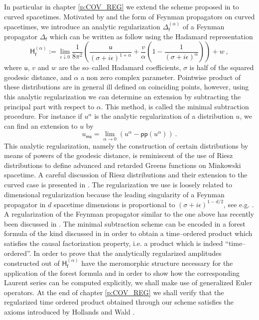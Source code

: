 \documentclass[11pt]{book}
\newcommand{\pp}{\mathsf{pp}}
\newcommand{\ms}{\mathsf{ms}}
\newcommand{\Hsf}{\mathsf{H}}
\newcommand{\fsf}{\mathsf{f}}
\newcommand{\usf}{\mathsf{u}}
\theoremstyle{break}
\begin{document}
In particular in chapter \ref{p:COV_REG} we extend the scheme proposed in \cite{DFKR_2014} to curved spacetimes. Motivated by \cite{BG_1972} and the form of Feynman propagators on curved spacetimes, we introduce an analytic regularization $\Delta^{(\alpha)}_\fsf$ of a Feynman propagator $\Delta_\fsf$ which can be written as follow using the Hadamard representation
%
\begin{equation*}
\Hsf^{(\alpha)}_\fsf := \lim_{\epsilon \downarrow 0} \frac{1}{8\pi^2} \left(\frac{\usf}{(\sigma+i\epsilon )^{1+\alpha}} + \frac{v}{\alpha} \left(1-\frac{1}{(\sigma+i\epsilon )^{\alpha}}\right)\right) + w \ ,
\end{equation*}
%
where $\usf$, $v$ and $w$ are the so--called Hadamard coefficients, $\sigma$ is half of the squared geodesic distance, and $\alpha$ a non zero complex parameter. Pointwise product of these distributions are in general ill defined on coinciding points, however, using this analytic regularization we can determine an extension by subtracting the principal part with respect to $\alpha$. This method, is called the minimal subtraction procedure. For instance if $u^\alpha$ is the analytic regularization of a distribution $u$, we can find an extension to $u$ by
%
\begin{equation*}
u_\ms = \lim_{\alpha \to 0} \left( u^\alpha - \pp(u^\alpha) \right) \ .
\end{equation*}
%
This analytic regularization, namely the construction of certain distributions by means of powers of the geodesic distance, is reminiscent of the use of Riesz distributions to define advanced and retarded Greens functions on Minkowski spacetime. A careful discussion of Riesz distributions and their extension to the curved case is presented in \cite{BGP_2007}. The regularization we use is loosely related to dimensional regularization because the leading singularity of a Feynman propagator in $d$ spacetime dimensions is proportional to $(\sigma+i\epsilon)^{1-d/2}$, see e.g. \cite[Appendix A]{MORETTI_2003}. A regularization of the Feynman propagator similar to the one above has recently been discussed in \cite{DANG_2015}. The minimal subtraction scheme can be encoded in a forest formula of the kind discussed in \cite{HOLLANDS_2010,KELLER_2010,DFKR_2014} in order to obtain a time--ordered product which satisfies the causal factorization property, i.e. a product which is indeed ``time--ordered''. In order to prove that the analytically regularized amplitudes constructed out of $\Hsf^{(\alpha)}_\fsf$ have the meromorphic structure necessary for the application of the forest formula and in order to show how the corresponding Laurent series can be computed explicitly, we shall make use of generalized Euler operators. At the end of chapter \ref{p:COV_REG} we shall verify that the regularized time ordered product obtained through our scheme satisfies the axioms introduced by Hollands and Wald \cite{HW_2001,HW_2002}.
\end{document}

